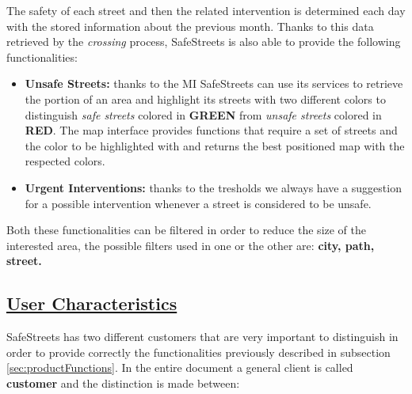 		The safety of each street and then the related intervention is determined each day with the stored information about the previous month. Thanks to this data retrieved by the \emph{crossing} process, SafeStreets is also able to provide the following functionalities:
		
		 \begin{itemize}
		 	\item \textbf{Unsafe Streets:} thanks to the MI SafeStreets can use its services to retrieve the portion of an area and highlight its streets with two different colors to distinguish \emph{safe streets} colored in \textbf{GREEN} from \emph{unsafe streets} colored in \textbf{RED}. The map interface provides functions that require a set of streets and the color to be highlighted with and returns the best positioned map with the respected colors. 
		 	
		 	\item \textbf{Urgent Interventions:} thanks to the tresholds we always have a suggestion for a possible intervention whenever a street is considered to be unsafe. 
		 \end{itemize}
	 
	 	Both these functionalities can be filtered in order to reduce the size of the interested area, the possible filters used in one or the other are: \textbf{city, path, street.}
		
\subsection[User Characteristics]{\hyperlink{toc}{User Characteristics}}
	\label{sec:userCharacteristics}
	SafeStreets has two different customers that are very important to distinguish in order to provide correctly the functionalities previously described in subsection \ref{sec:productFunctions}. In the entire document a general client is called \textbf{customer} and the distinction is made between:
	
